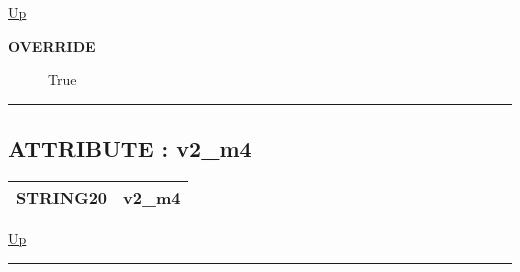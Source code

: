 \hyperlink{ecldoc:intest.example_2.mod_4}{Up}

\par

\par
\begin{description}
\item [\textbf{OVERRIDE}] True
\end{description}

\rule{\textwidth}{0.4pt}
\subsection*{ATTRIBUTE : v2\_m4}
\hypertarget{ecldoc:intest.example_2.mod_4.v2_m4}{}

{\renewcommand{\arraystretch}{1.5}
\begin{tabularx}{\textwidth}{|>{\raggedright\arraybackslash}l|X|}
\hline
\hspace{0pt}STRING20 & v2\_m4 \\
\hline
\end{tabularx}
}

\hyperlink{ecldoc:intest.example_2.mod_4}{Up}

\par


\rule{\textwidth}{0.4pt}




